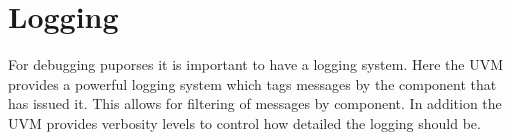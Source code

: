 \section{Logging} %
\label{sec:logging}

For debugging puporses it is important to have a logging system. Here the UVM provides a powerful logging system
which tags messages by the component that has issued it. This allows for filtering of messages by component. In
addition the UVM provides verbosity levels to control how detailed the logging should be.

